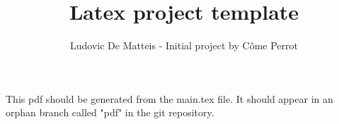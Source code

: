 \documentclass[a4paper, 10pt, conference, onecolumn]{IEEE_template/IEEEtran}
\title{Latex project template}
\author{Ludovic De Matteis - Initial project by Côme Perrot}
\date{}
\begin{document}
This pdf should be generated from the main.tex file. It should appear in an orphan branch called "pdf" in the git repository.

\maketitle
\tableofcontents


\end{document}
